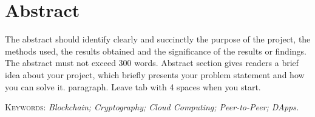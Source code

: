 \chapter*{Abstract}

The abstract should identify clearly and succinctly the purpose of the project, the methods used, the results obtained and the significance of the results or findings. The abstract must not exceed 300 words. Abstract section gives readers a brief idea about your project, which briefly presents your problem statement and how you can solve it. paragraph. Leave tab with 4 spaces when you start.


\vspace{1cm}
\noindent
\textsc{Keywords}: \textsl{ Blockchain; Cryptography; Cloud Computing; Peer-to-Peer; DApps.}